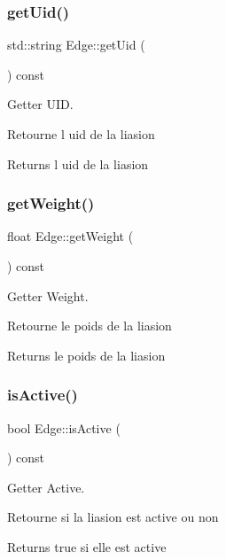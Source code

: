 \subsubsection{\texorpdfstring{get\+Uid()}{getUid()}}
{\footnotesize\ttfamily std\+::string Edge\+::get\+Uid (\begin{DoxyParamCaption}{ }\end{DoxyParamCaption}) const}



Getter U\+ID. 

Retourne l uid de la liasion

\begin{DoxyReturn}{Returns}
l uid de la liasion 
\end{DoxyReturn}
\mbox{\label{class_edge_a873322923fa6340e17edb39b923f7d61}} 
\subsubsection{\texorpdfstring{get\+Weight()}{getWeight()}}
{\footnotesize\ttfamily float Edge\+::get\+Weight (\begin{DoxyParamCaption}{ }\end{DoxyParamCaption}) const}



Getter Weight. 

Retourne le poids de la liasion

\begin{DoxyReturn}{Returns}
le poids de la liasion 
\end{DoxyReturn}
\mbox{\label{class_edge_a29524dddcadb4eae07997fa8fb6fd76f}} 
\subsubsection{\texorpdfstring{is\+Active()}{isActive()}}
{\footnotesize\ttfamily bool Edge\+::is\+Active (\begin{DoxyParamCaption}{ }\end{DoxyParamCaption}) const}



Getter Active. 

Retourne si la liasion est active ou non

\begin{DoxyReturn}{Returns}
true si elle est active 
\end{DoxyReturn}
\mbox{\label{class_edge_a91b5c22287996d54ae90b1393d11e98c}} 

